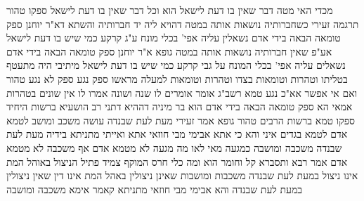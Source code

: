 \documentclass[12pt, openany]{book}
\begin{document}
{מכדי האי מטה דבר שאין בו דעת לישאל הוא וכל דבר שאין בו דעת לישאל ספקו טהור  תרגמה זעירי  כשחברותיה נושאות אותה במטה דהויא ליה יד חברותיה 
והשתא דא"ר יוחנן  ספק טומאה הבאה בידי אדם נשאלין עליה אפי' בכלי מונח ע"ג קרקע כמי שיש בו דעת לישאל אע"פ שאין חברותיה נושאות אותה במטה 
גופא א"ר יוחנן  ספק טומאה הבאה בידי אדם נשאלים עליה אפי' בכלי המונח על גבי קרקע כמי שיש בו דעת לישאל 
מיתיבי היה מתעטף בטליתו וטהרות וטומאות בצדו וטהרות וטומאות למעלה מראשו ספק נגע ספק לא נגע טהור  ואם אי אפשר אא"כ נגע טמא 
רשב"ג אומר  אומרים לו שנה ושונה  אמרו לו  אין שונים בטהרות
אמאי  הא ספק טומאה הבאה בידי אדם הוא 
בר מיניה דההיא דתני רב הושעיא   ברשות היחיד ספקו טמא ברשות הרבים טהור 
גופא אמר זעירי  מעת לעת שבנדה עושה משכב ומושב לטמא אדם לטמא בגדים 
איני והא כי אתא אבימי מבי חוזאי אתא ואייתי מתניתא בידיה  מעת לעת שבנדה משכבה ומושבה כמגעה  מאי לאו מה  מגעה לא מטמא אדם אף משכבה לא מטמא אדם 
אמר רבא  ותסברא  קל וחומר הוא ומה כלי חרס המוקף צמיד פתיל הניצול באוהל המת אינו ניצול במעת לעת שבנדה  משכבות ומושבות שאינן ניצולין באהל המת אינו דין שאין ניצולין במעת לעת שבנדה 
והא אבימי מבי חוזאי מתניתא קאמר  אימא  משכבה ומושבה}
\end{document}
